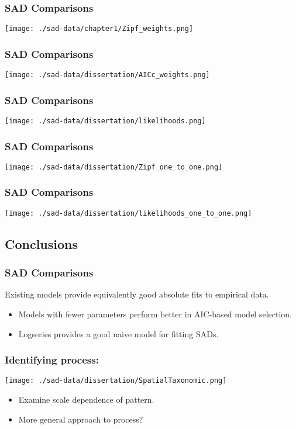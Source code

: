 \documentclass[14pt]{beamer}
\begin{document}
\begin{frame}{}
\frametitle{SAD Comparisons}
\texttt{[image: ./sad-data/chapter1/Zipf\_weights.png]}
\end{frame}


\begin{frame}{}
\frametitle{SAD Comparisons}
\texttt{[image: ./sad-data/dissertation/AICc\_weights.png]}
\end{frame}

\begin{frame}{}
\frametitle{SAD Comparisons}
\texttt{[image: ./sad-data/dissertation/likelihoods.png]}
\end{frame}

\begin{frame}{}
\frametitle{SAD Comparisons}
\texttt{[image: ./sad-data/dissertation/Zipf\_one\_to\_one.png]}
\end{frame}

\begin{frame}{}
\frametitle{SAD Comparisons}
\texttt{[image: ./sad-data/dissertation/likelihoods\_one\_to\_one.png]}
\end{frame}

\subsection{Conclusions}
\begin{frame}
\frametitle{SAD Comparisons}
Existing models provide equivalently good absolute fits to empirical data.
\begin{itemize}
\item Models with fewer parameters perform better in AIC-based model selection.\\
\item Logseries provides a good naive model for fitting SADs.\\
\end{itemize}
\end{frame}

\begin{frame}[t]
\frametitle{Identifying process:}
\vspace{-7pt}
\begin{center}
\texttt{[image: ./sad-data/dissertation/SpatialTaxonomic.png]}
\end{center}
\begin{itemize}
\item Examine scale dependence of pattern.
\item More general approach to process?
\end{itemize}
\end{frame}
\end{document}
